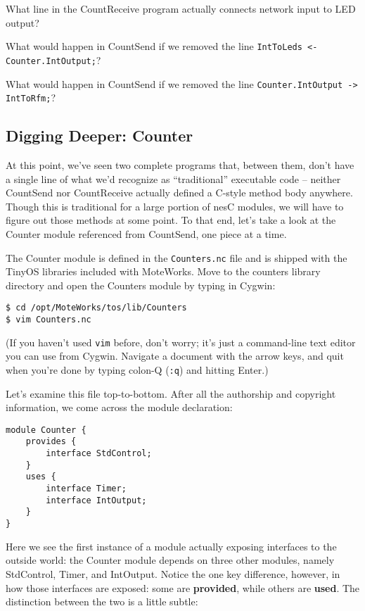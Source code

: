 \documentclass{article}
\begin{document}
 What line in the CountReceive program actually connects network input to LED output?

 What would happen in CountSend if we removed the line \verb!IntToLeds <- Counter.IntOutput;!?

 What would happen in CountSend if we removed the line \verb!Counter.IntOutput -> IntToRfm;!?

\subsection*{Digging Deeper: Counter}

At this point, we've seen two complete programs that, between them, don't have a single line of what we'd recognize as ``traditional'' executable code -- neither CountSend nor CountReceive actually defined a C-style method body anywhere. Though this is traditional for a large portion of nesC modules, we will have to figure out those methods at some point. To that end, let's take a look at the Counter module referenced from CountSend, one piece at a time.

The Counter module is defined in the \verb!Counters.nc! file and is shipped with the TinyOS libraries included with MoteWorks. Move to the counters library directory and open the Counters module by typing in Cygwin:

\begin{verbatim}
$ cd /opt/MoteWorks/tos/lib/Counters
$ vim Counters.nc
\end{verbatim}

(If you haven't used \verb!vim! before, don't worry; it's just a command-line text editor you can use from Cygwin. Navigate a document with the arrow keys, and quit when you're done by typing colon-Q (\verb!:q!) and hitting Enter.)

Let's examine this file top-to-bottom. After all the authorship and copyright information, we come across the module declaration:

\begin{verbatim}
module Counter {
    provides {
        interface StdControl;
    }
    uses {
        interface Timer;
        interface IntOutput;
    }
}
\end{verbatim}

Here we see the first instance of a module actually exposing interfaces to the outside world: the Counter module depends on three other modules, namely StdControl, Timer, and IntOutput. Notice the one key difference, however, in how those interfaces are exposed: some are \textbf{provided}, while others are \textbf{used}. The distinction between the two is a little subtle:
\end{document}
